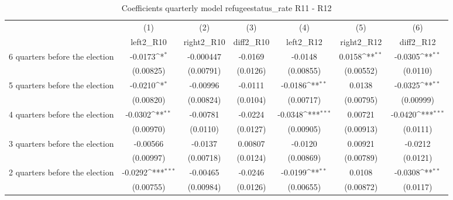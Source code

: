 \begin{table}[!ht]\centering \footnotesize
\def\sym#1{\ifmmode^{#1}\else\(^{#1}\)\fi}
\caption{Coefficients quarterly model refugeestatus\_rate R11 - R12}
\begin{tabular}{l*{6}{c}}
\hline\hline
                    &\multicolumn{1}{c}{(1)}&\multicolumn{1}{c}{(2)}&\multicolumn{1}{c}{(3)}&\multicolumn{1}{c}{(4)}&\multicolumn{1}{c}{(5)}&\multicolumn{1}{c}{(6)}\\
                    &\multicolumn{1}{c}{left2\_R10}&\multicolumn{1}{c}{right2\_R10}&\multicolumn{1}{c}{diff2\_R10}&\multicolumn{1}{c}{left2\_R12}&\multicolumn{1}{c}{right2\_R12}&\multicolumn{1}{c}{diff2\_R12}\\
\hline
 6 quarters before the election&     -0.0173\sym{*}  &   -0.000447         &     -0.0169         &     -0.0148         &      0.0158\sym{**} &     -0.0305\sym{**} \\
                    &   (0.00825)         &   (0.00791)         &    (0.0126)         &   (0.00855)         &   (0.00552)         &    (0.0110)         \\
[1em]
 5 quarters before the election&     -0.0210\sym{*}  &    -0.00996         &     -0.0111         &     -0.0186\sym{**} &      0.0138         &     -0.0325\sym{**} \\
                    &   (0.00820)         &   (0.00824)         &    (0.0104)         &   (0.00717)         &   (0.00795)         &   (0.00999)         \\
[1em]
 4 quarters before the election&     -0.0302\sym{**} &    -0.00781         &     -0.0224         &     -0.0348\sym{***}&     0.00721         &     -0.0420\sym{***}\\
                    &   (0.00970)         &    (0.0110)         &    (0.0127)         &   (0.00905)         &   (0.00913)         &    (0.0111)         \\
[1em]
 3 quarters before the election&    -0.00566         &     -0.0137         &     0.00807         &     -0.0120         &     0.00921         &     -0.0212         \\
                    &   (0.00997)         &   (0.00718)         &    (0.0124)         &   (0.00869)         &   (0.00789)         &    (0.0121)         \\
[1em]
 2 quarters before the election&     -0.0292\sym{***}&    -0.00465         &     -0.0246         &     -0.0199\sym{**} &      0.0108         &     -0.0308\sym{**} \\
                    &   (0.00755)         &   (0.00984)         &    (0.0126)         &   (0.00655)         &   (0.00872)         &    (0.0117)         \\

\end{tabular}
\end{table}
